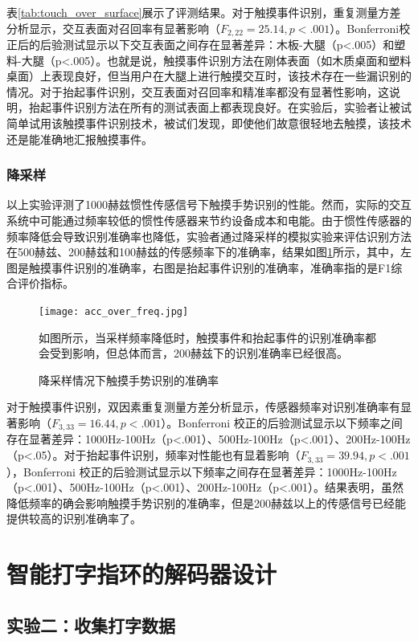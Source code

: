 表\ref{tab:touch_over_surface}展示了评测结果。对于触摸事件识别，重复测量方差分析显示，交互表面对召回率有显著影响（$F_{2,22}=25.14,p<.001$）。Bonferroni校正后的后验测试显示以下交互表面之间存在显著差异：木板-大腿（p<.005）和塑料-大腿（p<.005）。也就是说，触摸事件识别方法在刚体表面（如木质桌面和塑料桌面）上表现良好，但当用户在大腿上进行触摸交互时，该技术存在一些漏识别的情况。对于抬起事件识别，交互表面对召回率和精准率都没有显著性影响，这说明，抬起事件识别方法在所有的测试表面上都表现良好。在实验后，实验者让被试简单试用该触摸事件识别技术，被试们发现，即使他们故意很轻地去触摸，该技术还是能准确地汇报触摸事件。

\subsubsection{降采样}

以上实验评测了1000赫兹惯性传感信号下触摸手势识别的性能。然而，实际的交互系统中可能通过频率较低的惯性传感器来节约设备成本和电能。由于惯性传感器的频率降低会导致识别准确率也降低，实验者通过降采样的模拟实验来评估识别方法在500赫兹、200赫兹和100赫兹的传感频率下的准确率，结果如图\ref{fig:acc_over_freq}所示，其中，左图是触摸事件识别的准确率，右图是抬起事件识别的准确率，准确率指的是F1综合评价指标。

\begin{figure}
	\centering
	\texttt{[image: acc\_over\_freq.jpg]}
	\caption*{如图所示，当采样频率降低时，触摸事件和抬起事件的识别准确率都会受到影响，但总体而言，200赫兹下的识别准确率已经很高。}
	\caption{降采样情况下触摸手势识别的准确率}
	\label{fig:acc_over_freq}
\end{figure}

对于触摸事件识别，双因素重复测量方差分析显示，传感器频率对识别准确率有显著影响（$F_{3,33}=16.44,p<.001$）。Bonferroni 校正的后验测试显示以下频率之间存在显著差异：1000Hz-100Hz（p<.001）、500Hz-100Hz（p<.001）、200Hz-100Hz（p<.05）。对于抬起事件识别，频率对性能也有显着影响（$F_{3,33}=39.94,p<.001$），Bonferroni 校正的后验测试显示以下频率之间存在显著差异：1000Hz-100Hz（p<.001）、500Hz-100Hz（p<.001）、200Hz-100Hz（p<.001）。结果表明，虽然降低频率的确会影响触摸手势识别的准确率，但是200赫兹以上的传感信号已经能提供较高的识别准确率了。

\section{智能打字指环的解码器设计}

\subsection{实验二：收集打字数据}

